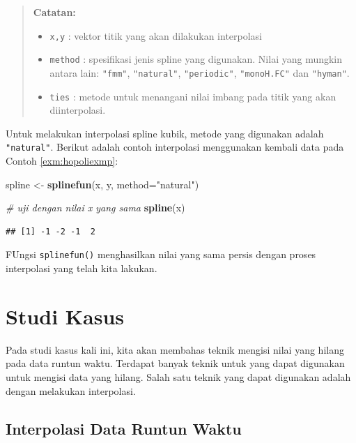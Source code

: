 \documentclass[
]{book}
\newenvironment{Shaded}{\begin{snugshade}}{\end{snugshade}}
\newcommand{\AttributeTok}[1]{\textcolor[rgb]{0.13,0.29,0.53}{#1}}
\newcommand{\CommentTok}[1]{\textcolor[rgb]{0.56,0.35,0.01}{\textit{#1}}}
\newcommand{\FunctionTok}[1]{\textcolor[rgb]{0.13,0.29,0.53}{\textbf{#1}}}
\newcommand{\NormalTok}[1]{#1}
\newcommand{\OtherTok}[1]{\textcolor[rgb]{0.56,0.35,0.01}{#1}}
\newcommand{\StringTok}[1]{\textcolor[rgb]{0.31,0.60,0.02}{#1}}
\providecommand{\tightlist}{%
  \setlength{\itemsep}{0pt}\setlength{\parskip}{0pt}}
\theoremstyle{definition}
\theoremstyle{definition}
\theoremstyle{definition}
\theoremstyle{definition}
\theoremstyle{remark}
\begin{document}
\begin{quote}
\textbf{Catatan:}

\begin{itemize}
\tightlist
\item
  \texttt{x,y} : vektor titik yang akan dilakukan interpolasi
\item
  \texttt{method} : spesifikasi jenis spline yang digunakan. Nilai yang mungkin antara lain: \texttt{"fmm"}, \texttt{"natural"}, \texttt{"periodic"}, \texttt{"monoH.FC"} dan \texttt{"hyman"}.
\item
  \texttt{ties} : metode untuk menangani nilai imbang pada titik yang akan diinterpolasi.
\end{itemize}
\end{quote}

Untuk melakukan interpolasi spline kubik, metode yang digunakan adalah \texttt{"natural"}. Berikut adalah contoh interpolasi menggunakan kembali data pada Contoh \ref{exm:hopoliexmp}:

\begin{Shaded}
\begin{Highlighting}[]
\NormalTok{spline }\OtherTok{\textless{}{-}} \FunctionTok{splinefun}\NormalTok{(x, y, }\AttributeTok{method=}\StringTok{"natural"}\NormalTok{)}

\CommentTok{\# uji dengan nilai x yang sama}
\FunctionTok{spline}\NormalTok{(x)}
\end{Highlighting}
\end{Shaded}

\begin{verbatim}
## [1] -1 -2 -1  2
\end{verbatim}

FUngsi \texttt{splinefun()} menghasilkan nilai yang sama persis dengan proses interpolasi yang telah kita lakukan.

\hypertarget{studi-kasus-1}{%
\section{Studi Kasus}\label{studi-kasus-1}}

Pada studi kasus kali ini, kita akan membahas teknik mengisi nilai yang hilang pada data runtun waktu. Terdapat banyak teknik untuk yang dapat digunakan untuk mengisi data yang hilang. Salah satu teknik yang dapat digunakan adalah dengan melakukan interpolasi.

\hypertarget{interpolasi-data-runtun-waktu}{%
\subsection{Interpolasi Data Runtun Waktu}\label{interpolasi-data-runtun-waktu}}
\end{document}
